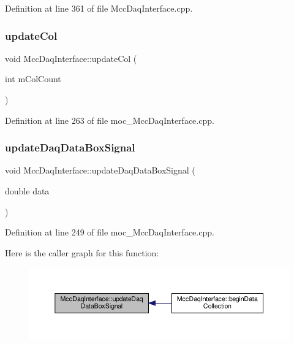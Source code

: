 Definition at line 361 of file Mcc\+Daq\+Interface.\+cpp.

\mbox{\label{class_mcc_daq_interface_ad055cd5057d78af30c9f97ffef48f6bc}} 
\subsubsection{\texorpdfstring{update\+Col}{updateCol}}
{\footnotesize\ttfamily void Mcc\+Daq\+Interface\+::update\+Col (\begin{DoxyParamCaption}\item[{int}]{m\+Col\+Count }\end{DoxyParamCaption})\hspace{0.3cm}{\ttfamily [signal]}}



Definition at line 263 of file moc\+\_\+\+Mcc\+Daq\+Interface.\+cpp.

\mbox{\label{class_mcc_daq_interface_a86cd2addd88adddadaccae76d3cf0b22}} 
\subsubsection{\texorpdfstring{update\+Daq\+Data\+Box\+Signal}{updateDaqDataBoxSignal}}
{\footnotesize\ttfamily void Mcc\+Daq\+Interface\+::update\+Daq\+Data\+Box\+Signal (\begin{DoxyParamCaption}\item[{double}]{data }\end{DoxyParamCaption})\hspace{0.3cm}{\ttfamily [signal]}}



Definition at line 249 of file moc\+\_\+\+Mcc\+Daq\+Interface.\+cpp.

Here is the caller graph for this function\+:
\nopagebreak
\begin{figure}[H]
\begin{center}
\leavevmode
\includegraphics[width=350pt]{class_mcc_daq_interface_a86cd2addd88adddadaccae76d3cf0b22_icgraph}
\end{center}
\end{figure}
\mbox{\label{class_mcc_daq_interface_a66f961728aca729d4a93930d695b6cb9}} 
